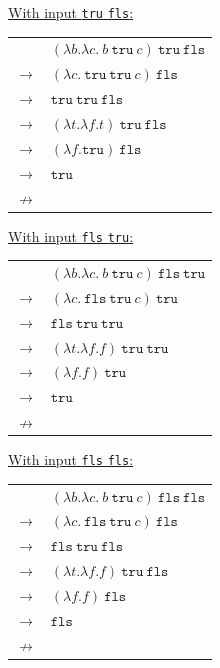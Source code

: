 \documentclass[12pt, fleqn]{article}
\begin{document}
\underline{With input \texttt{tru} \texttt{fls}:}
\begin{center}
    \begin{tabular}{c l}
    & $(\lambda b. \lambda c.\:b\:\texttt{tru}\:c)\:\texttt{tru}\:\texttt{fls}$ \\ 
    $\rightarrow$ & $(\lambda c.\:\texttt{tru}\:\texttt{tru}\:c)\:\texttt{fls}$ \\
    $\rightarrow$ & $\texttt{tru}\:\texttt{tru}\:\texttt{fls}$ \\
    $\rightarrow$ & $(\lambda t. \lambda f. t)\:\texttt{tru}\:\texttt{fls}$ \\
    $\rightarrow$ & $(\lambda f. \texttt{tru})\:\texttt{fls}$ \\
    $\rightarrow$ & $\texttt{tru}$ \\
    $\nrightarrow$ & \\
    \end{tabular}
\end{center}

\underline{With input \texttt{fls} \texttt{tru}:}
\begin{center}
    \begin{tabular}{c l}
    & $(\lambda b. \lambda c.\:b\:\texttt{tru}\:c)\:\texttt{fls}\:\texttt{tru}$ \\ 
    $\rightarrow$ & $(\lambda c.\:\texttt{fls}\:\texttt{tru}\:c)\:\texttt{tru}$ \\
    $\rightarrow$ & $\texttt{fls}\:\texttt{tru}\:\texttt{tru}$ \\
    $\rightarrow$ & $(\lambda t. \lambda f. f)\:\texttt{tru}\:\texttt{tru}$ \\
    $\rightarrow$ & $(\lambda f. f)\:\texttt{tru}$ \\
    $\rightarrow$ & $\texttt{tru}$ \\
    $\nrightarrow$ & \\
    \end{tabular}
\end{center}

\underline{With input \texttt{fls} \texttt{fls}:}
\begin{center}
    \begin{tabular}{c l}
    & $(\lambda b. \lambda c.\:b\:\texttt{tru}\:c)\:\texttt{fls}\:\texttt{fls}$ \\ 
    $\rightarrow$ & $(\lambda c.\:\texttt{fls}\:\texttt{tru}\:c)\:\texttt{fls}$ \\
    $\rightarrow$ & $\texttt{fls}\:\texttt{tru}\:\texttt{fls}$ \\
    $\rightarrow$ & $(\lambda t. \lambda f. f)\:\texttt{tru}\:\texttt{fls}$ \\
    $\rightarrow$ & $(\lambda f. f)\:\texttt{fls}$ \\
    $\rightarrow$ & $\texttt{fls}$ \\
    $\nrightarrow$ & \\
    \end{tabular}
\end{center}
\end{document}
